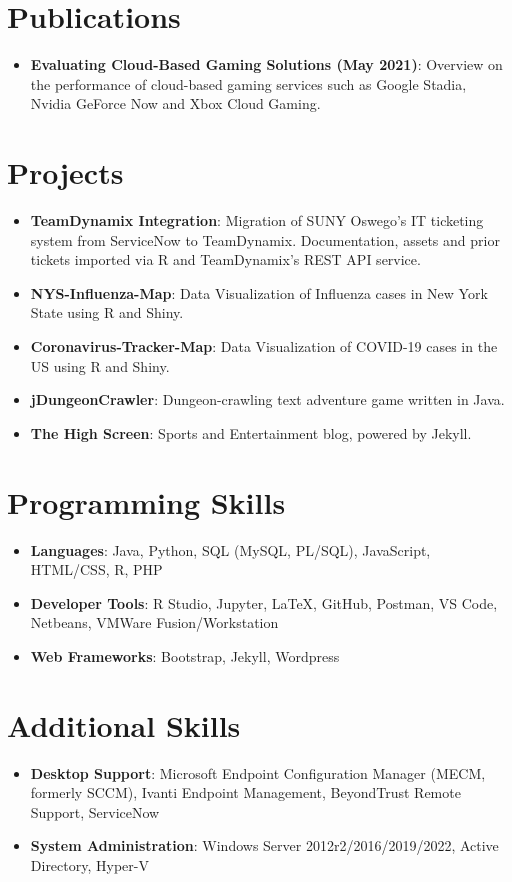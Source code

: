 \documentclass[letterpaper,11pt]{article}
\newcommand{\resumeItem}[2]{
  \item\small{
    \textbf{#1}{: #2 \vspace{-2pt}}
  }
}
\newcommand{\resumeSubItem}[2]{\resumeItem{#1}{#2}\vspace{-4pt}}
\newcommand{\resumeSubHeadingListStart}{\begin{itemize}[leftmargin=*]}
\newcommand{\resumeSubHeadingListEnd}{\end{itemize}}
\begin{document}
\section{Publications}
  	\resumeSubHeadingListStart
    	\resumeSubItem{Evaluating Cloud-Based Gaming Solutions (May 2021)}{Overview on the performance of cloud-based gaming services such as Google Stadia, Nvidia GeForce Now and Xbox Cloud Gaming.}
	\resumeSubHeadingListEnd

\section{Projects}
  	\resumeSubHeadingListStart
	  	\resumeSubItem{TeamDynamix Integration}{Migration of SUNY Oswego's IT ticketing system from ServiceNow to TeamDynamix. Documentation, assets and prior tickets imported via R and TeamDynamix's REST API service.}
   		\resumeSubItem{NYS-Influenza-Map}{Data Visualization of Influenza cases in New York State using R and Shiny.}
    	\resumeSubItem{Coronavirus-Tracker-Map}{Data Visualization of COVID-19 cases in the US using R and Shiny.}
   		\resumeSubItem{jDungeonCrawler}{Dungeon-crawling text adventure game written in Java.}
    	\resumeSubItem{The High Screen}{Sports and Entertainment blog, powered by Jekyll.}
  	\resumeSubHeadingListEnd

\section{Programming Skills}
  	\resumeSubHeadingListStart
    	\resumeSubItem{Languages}{Java, Python, SQL (MySQL, PL/SQL), JavaScript, HTML/CSS, R, PHP} 
   		\resumeSubItem{Developer Tools}{R Studio, Jupyter, LaTeX, GitHub, Postman, VS Code, Netbeans, VMWare Fusion/Workstation}
    	\resumeSubItem{Web Frameworks}{Bootstrap,  Jekyll, Wordpress} 
  	\resumeSubHeadingListEnd

\section{Additional Skills}
  	\resumeSubHeadingListStart
    	\resumeSubItem{Desktop Support}{Microsoft Endpoint Configuration Manager (MECM, formerly SCCM), Ivanti Endpoint Management, BeyondTrust Remote Support, ServiceNow}
   		\resumeSubItem{System Administration}{Windows Server 2012r2/2016/2019/2022, Active Directory, Hyper-V}
  	\resumeSubHeadingListEnd

\end{document}
